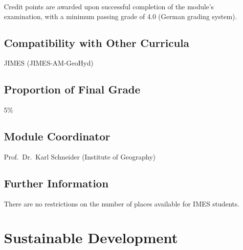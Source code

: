 \documentclass[
  letterpaper,
  10pt,
  openany]{book}
\begin{document}

Credit points are awarded upon successful completion of the module's
examination, with a minimum passing grade of 4.0 (German grading
system).

\section*{Compatibility with Other
Curricula}\label{compatibility-with-other-curricula}


JIMES (JIMES-AM-GeoHyd)

\section*{Proportion of Final Grade}\label{proportion-of-final-grade}


5\%

\section*{Module Coordinator}\label{module-coordinator}


Prof.~Dr.~Karl Schneider (Institute of Geography)

\section*{Further Information}\label{further-information}


There are no restrictions on the number of places available for IMES
students.

\chapter*{Sustainable Development}\label{sustainable-development}

\end{document}

